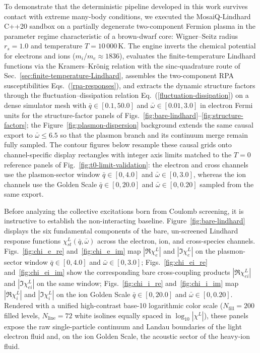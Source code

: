 \documentclass[aps,showkeys,noshowpacs,superscriptaddress,pre,preprint]{revtex4-2}
\begin{document}
To demonstrate that the deterministic pipeline developed in this work survives contact with extreme many-body conditions,
we executed the MosaiQ-Lindhard C++20 sandbox on a partially degenerate two-component Fermion plasma
in the parameter regime characteristic of a brown-dwarf core:
Wigner--Seitz radius $r_s = 1.0$ and temperature $T = 10\,000\,\mathrm{K}$.
The engine inverts the chemical potential for electrons and ions ($m_i/m_e \approx 1836$),
evaluates the finite-temperature Lindhard functions via the Kramers--Kr\"onig relation with the sinc-quadrature route of Sec.~\ref{sec:finite-temperature-Lindhard},
assembles the two-component RPA susceptibilities Eqs.~(\ref{rpa-responses}),
and extracts the dynamic structure factors through the fluctuation--dissipation relation Eq.~(\ref{fluctuation-dissipation})
on a dense simulator mesh with $\bar{q} \in [0.1, 50.0]$ and $\bar{\omega} \in [0.01, 3.0]$ in electron Fermi units for the structure-factor panels of Figs.~\ref{fig:bare-lindhard}--\ref{fig:structure-factors};
the Figure~\ref{fig:plasmon-dispersion} background extends the same causal export to $\bar{\omega} \le 6.5$ so that the plasmon branch and its continuum merge remain fully sampled.
The contour figures below resample these causal grids onto channel-specific display rectangles with integer axis limits matched to the $T=0$ reference panels of Fig.~\ref{fig:t0-limit-validation}: the electron and cross channels use the plasmon-sector window $\bar{q} \in [0, 4.0]$ and $\bar{\omega} \in [0, 3.0]$, whereas the ion channels use the Golden Scale $\bar{q} \in [0, 20.0]$ and $\bar{\omega} \in [0, 0.20]$ sampled from the same export.

Before analyzing the collective excitations born from Coulomb screening, it is instructive to establish the non-interacting baseline.
Figure~\ref{fig:bare-lindhard} displays the six fundamental components of the bare, un-screened Lindhard response functions $\chi_{st}^L(\bar{q}, \bar{\omega})$ across the electron, ion, and cross-species channels.
Figs.~\ref{fig:chi_e_re} and~\ref{fig:chi_e_im} map $|\Re \chi_{e}^L|$ and $|\Im \chi_{e}^L|$ on the plasmon-sector window $\bar{q} \in [0, 4.0]$ and $\bar{\omega} \in [0, 3.0]$;
Figs.~\ref{fig:chi_ei_re} and~\ref{fig:chi_ei_im} show the corresponding bare cross-coupling products $|\Re \chi_{ei}^L|$ and $|\Im \chi_{ei}^L|$ on the same window;
Figs.~\ref{fig:chi_i_re} and~\ref{fig:chi_i_im} map $|\Re \chi_{i}^L|$ and $|\Im \chi_{i}^L|$ on the ion Golden Scale $\bar{q} \in [0, 20.0]$ and $\bar{\omega} \in [0, 0.20]$.
Rendered with a unified high-contrast base-10 logarithmic color scale ($N_{\mathrm{fill}}=200$ filled levels, $N_{\mathrm{line}}=72$ white isolines equally spaced in $\log_{10}|\chi^L|$), these panels expose the raw single-particle continuum and Landau boundaries of the light electron fluid and, on the ion Golden Scale, the acoustic sector of the heavy-ion fluid.
\end{document}
